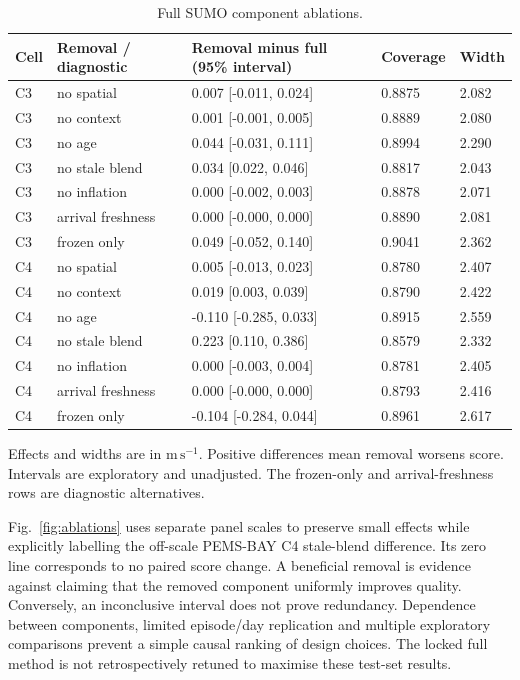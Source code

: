 \documentclass[pdflatex,sn-mathphys-num]{sn-jnl}
\newcommand{\ms}{\mathrm{m\,s^{-1}}}
\begin{document}
\begin{table}[!htbp]
\caption{Full SUMO component ablations.}\label{tab:ablation-sumo}
\centering\setlength{\tabcolsep}{3pt}\small
\begin{tabular}{lllll}\toprule
Cell & Removal / diagnostic & Removal minus full (95\% interval) & Coverage & Width \\\midrule
C3 & no spatial & 0.007 [-0.011, 0.024] & 0.8875 & 2.082 \\
C3 & no context & 0.001 [-0.001, 0.005] & 0.8889 & 2.080 \\
C3 & no age & 0.044 [-0.031, 0.111] & 0.8994 & 2.290 \\
C3 & no stale blend & 0.034 [0.022, 0.046] & 0.8817 & 2.043 \\
C3 & no inflation & 0.000 [-0.002, 0.003] & 0.8878 & 2.071 \\
C3 & arrival freshness & 0.000 [-0.000, 0.000] & 0.8890 & 2.081 \\
C3 & frozen only & 0.049 [-0.052, 0.140] & 0.9041 & 2.362 \\
C4 & no spatial & 0.005 [-0.013, 0.023] & 0.8780 & 2.407 \\
C4 & no context & 0.019 [0.003, 0.039] & 0.8790 & 2.422 \\
C4 & no age & -0.110 [-0.285, 0.033] & 0.8915 & 2.559 \\
C4 & no stale blend & 0.223 [0.110, 0.386] & 0.8579 & 2.332 \\
C4 & no inflation & 0.000 [-0.003, 0.004] & 0.8781 & 2.405 \\
C4 & arrival freshness & 0.000 [-0.000, 0.000] & 0.8793 & 2.416 \\
C4 & frozen only & -0.104 [-0.284, 0.044] & 0.8961 & 2.617 \\
\bottomrule\end{tabular}
\par\smallskip\footnotesize Effects and widths are in $\ms$. Positive differences mean removal worsens score. Intervals are exploratory and unadjusted. The frozen-only and arrival-freshness rows are diagnostic alternatives.
\end{table}
\FloatBarrier

Fig.~\ref{fig:ablations} uses separate panel scales to preserve small effects while explicitly labelling the off-scale PEMS-BAY C4 stale-blend difference. Its zero line corresponds to no paired score change. A beneficial removal is evidence against claiming that the removed component uniformly improves quality. Conversely, an inconclusive interval does not prove redundancy. Dependence between components, limited episode/day replication and multiple exploratory comparisons prevent a simple causal ranking of design choices. The locked full method is not retrospectively retuned to maximise these test-set results.
\end{document}
